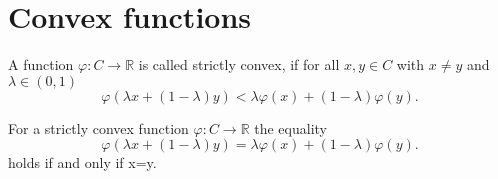 \section{Convex functions}




  

  


\begin{definition}
  A function $\varphi: C \to \mathbb{R}$ is called strictly convex, if for all $x,y \in C$ with $x \neq y$ and $\lambda \in (0,1)$
  \[
  \varphi (\lambda x + (1-\lambda)y) < \lambda \varphi(x) + (1-\lambda) \varphi(y).
  \]
\end{definition}

\begin{proposition}\label{convex_eq}
  For a strictly convex function $\varphi: C \to \mathbb{R}$ the equality
  \[
  \varphi (\lambda x + (1-\lambda)y) = \lambda \varphi(x) + (1-\lambda) \varphi(y).
  \]
  holds if and only if x=y.
  
\end{proposition}

